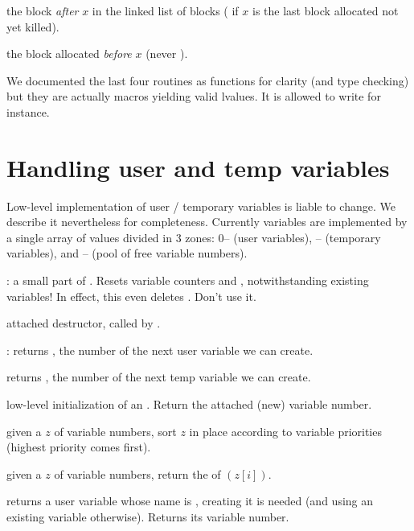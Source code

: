  the block \emph{after} $x$ in the linked list of
blocks ( if $x$ is the last block allocated not yet killed).

 the block allocated \emph{before} $x$ (never
).

We documented the last four routines as functions for clarity (and type
checking) but they are actually macros yielding valid lvalues. It is allowed
to write  for instance.

\section{Handling user and temp variables}
Low-level implementation of user / temporary variables is liable to change. We
describe it nevertheless for completeness. Currently variables are
implemented by a single array of values divided in 3 zones: 0--
(user variables), -- (temporary variables),
and -- (pool of free variable numbers).


: a small part of . Resets
variable counters  and , notwithstanding existing
variables! In effect, this even deletes . Don't use it.

 attached destructor, called by
.

: returns , the number of the next user
variable we can create.

 returns , the number of the
next temp variable we can create.

 low-level initialization of an
. Return the attached (new) variable number.

 given a  $z$ of variable
numbers, sort $z$ in place according to variable priorities (highest priority
comes first).

 given a  $z$ of variable numbers,
return the  of $(z[i])$.


 returns a user variable whose name
is , creating it is needed (and using an existing variable otherwise).
Returns its variable number.

